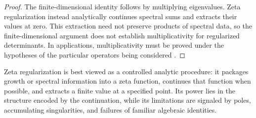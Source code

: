 \begin{proof}
The finite-dimensional identity follows by multiplying eigenvalues. Zeta regularization instead analytically continues spectral sums and extracts their values at zero. This extraction need not preserve products of spectral data, so the finite-dimensional argument does not establish multiplicativity for regularized determinants. In applications, multiplicativity must be proved under the hypotheses of the particular operators being considered \cite{SotoVillada2026ZR}.
\end{proof}

Zeta regularization is best viewed as a controlled analytic procedure: it packages growth or spectral information into a zeta function, continues that function when possible, and extracts a finite value at a specified point. Its power lies in the structure encoded by the continuation, while its limitations are signaled by poles, accumulating singularities, and failures of familiar algebraic identities.